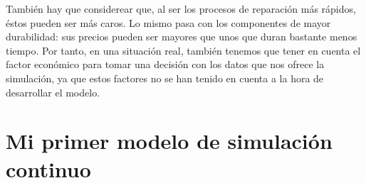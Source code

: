 \documentclass[11pt,a4paper]{report}
\begin{document}
También hay que considerear que, al ser los procesos de reparación más rápidos, éstos pueden ser más caros. Lo mismo pasa
con los componentes de mayor durabilidad: sus precios pueden ser mayores que unos que duran bastante menos tiempo. Por tanto,
en una situación real, también tenemos que tener en cuenta el factor económico para tomar una decisión con los datos que
nos ofrece la simulación, ya que estos factores no se han tenido en cuenta a la hora de desarrollar el modelo.

\newpage

\chapter{Mi primer modelo de simulación continuo}
\end{document}
